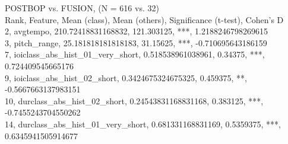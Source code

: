POSTBOP vs. FUSION, (N = 616 vs. 32)\\
Rank, Feature, Mean (class), Mean (others), Significance (t-test), Cohen's D\\
2, avgtempo, 210.72418831168832, 121.303125, ***, 1.2188246798269615\\
3, pitch_range, 25.181818181818183, 31.15625, ***, -0.710695643186159\\
7, ioiclass_abs_hist_01_very_short, 0.518538961038961, 0.34375, ***, 0.724409545665176\\
9, ioiclass_abs_hist_02_short, 0.3424675324675325, 0.459375, **, -0.5667663137983151\\
10, durclass_abs_hist_02_short, 0.24543831168831168, 0.383125, ***, -0.7455243704550262\\
14, durclass_abs_hist_01_very_short, 0.681331168831169, 0.5359375, ***, 0.6345941505914677\\

